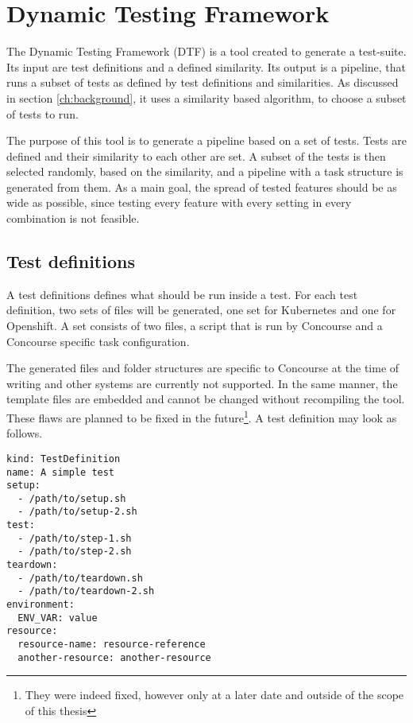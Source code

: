 \section{Dynamic Testing Framework}\label{sec:dynamic-testing-framework}

The Dynamic Testing Framework (DTF) is a tool created to generate a test-suite.
Its input are test definitions and a defined similarity.
Its output is a pipeline, that runs a subset of tests as defined by test definitions and similarities.
As discussed in section \ref{ch:background}, it uses a similarity based algorithm, to choose a subset of tests to run.

The purpose of this tool is to generate a pipeline based on a set of tests.
Tests are defined and their similarity to each other are set.
A subset of the tests is then selected randomly, based on the similarity, and a pipeline with a task structure is generated from them.
As a main goal, the spread of tested features should be as wide as possible, since testing every feature with every setting in every combination is not feasible.

\subsection{Test definitions}\label{subsec:test-definitions}

A test definitions defines what should be run inside a test.
For each test definition, two sets of files will be generated, one set for Kubernetes and one for Openshift.
A set consists of two files, a script that is run by Concourse and a Concourse specific task configuration.

The generated files and folder structures are specific to Concourse at the time of writing and other systems are currently not supported.
In the same manner, the template files are embedded and cannot be changed without recompiling the tool.
These flaws are planned to be fixed in the future\footnote{They were indeed fixed, however only at a later date and outside of the scope of this thesis}.
A test definition may look as follows.

\begin{verbatim}
kind: TestDefinition
name: A simple test
setup:
  - /path/to/setup.sh
  - /path/to/setup-2.sh
test:
  - /path/to/step-1.sh
  - /path/to/step-2.sh
teardown:
  - /path/to/teardown.sh
  - /path/to/teardown-2.sh
environment:
  ENV_VAR: value
resource:
  resource-name: resource-reference
  another-resource: another-resource
\end{verbatim}

